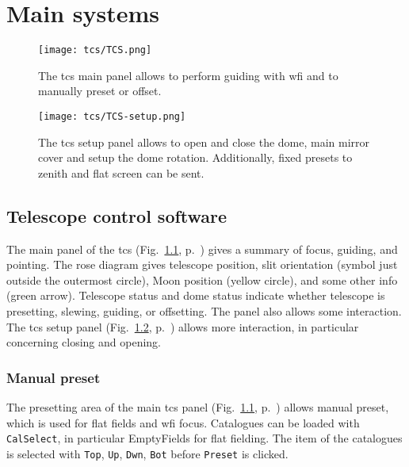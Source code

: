 \documentclass[11pt,fleqn]{book}
\def\figref#1{Fig.~\ref{fig:#1}, p.~\pageref{fig:#1}}
\begin{document}


\chapter{Main systems}
\label{compo}


\begin{figure}[!ht]
\centering
\texttt{[image: tcs/TCS.png]}
\caption[Main panel of the telescope control software]{The \gls{tcs} main panel allows to perform guiding with \gls{wfi} and to manually preset or offset.}
\label{fig:tcs}
\end{figure}

\begin{figure}[!ht]
\centering
\texttt{[image: tcs/TCS-setup.png]}
\caption[Setup panel of the telescope control software]{The \gls{tcs} setup panel allows to open and close the dome, main
mirror cover and setup the dome rotation.  Additionally, fixed presets
to zenith and flat screen can be sent.}
\label{fig:tcssetup}
\end{figure}

\section{Telescope control software}

The main panel of the \gls{tcs} (\figref{tcs}) gives a summary of focus,
guiding, and pointing. The rose diagram gives telescope position, slit
orientation (symbol just outside the outermost circle), Moon position (yellow
circle), and some other info (green arrow). Telescope status and dome status
indicate whether telescope is presetting, slewing, guiding, or offsetting.  The
panel also allows some interaction.  The \gls{tcs} setup panel
(\figref{tcssetup}) allows more interaction, in particular concerning
closing and opening.

\subsection{Manual preset}  
\label{manualpreset}


The presetting area  of the main \gls{tcs} panel (\figref{tcs}) allows manual
preset, which is used for flat fields and \gls{wfi} focus.  Catalogues can be loaded
with \texttt{CalSelect}, in particular EmptyFields for flat fielding. The item
of the catalogues is selected with \texttt{Top}, \texttt{Up}, \texttt{Dwn},
\texttt{Bot} before \texttt{Preset} is clicked.
\end{document}
